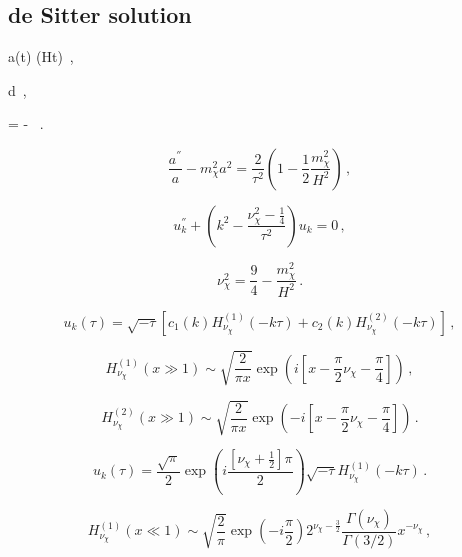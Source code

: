 \subsection{de Sitter solution}
\label{subsection:3.2.1}

\be 
a(t) \propto \exp(Ht)\, ,
\label{equation:3.2.26}
\ee

\be 
d\tau \equiv {}\, ,
\label{equation:3.2.27}
\ee

\be 
\tau = - \, .
\label{equation:3.2.28}
\ee

\begin{equation}
\frac{a^{''}}{a} - m_{\chi}^2 a^2 = \frac{2}{\tau^2} \left( 1 - \frac{1}{2}\frac{m_{\chi}^2}{H^2} \right) \, ,
\label{equation:3.2.29}
\end{equation}

\begin{equation}
u_k^{''} + \left( k^2 - \frac{\nu_{\chi}^2-\frac{1}{4}}{\tau^2} \right) u_k = 0 \, ,
\label{equation:3.2.30}
\end{equation}

\begin{equation}
\nu_{\chi}^2 = \frac{9}{4} - \frac{m_{\chi}^2}{H^2} \, .
\label{equation:3.2.31}
\end{equation}

\begin{equation}
u_k (\tau) = \sqrt{-\tau}\left [ c_1 (k) H_{\nu_{\chi}}^{(1)}(-k\tau) + c_2 (k) H_{\nu_{\chi}}^{(2)}(-k\tau) \right ] \, ,
\label{equation:3.2.32} 
\end{equation}

\begin{equation}
H_{\nu_{\chi}}^{(1)}(x \gg 1) \sim \sqrt{\frac{2}{\pi x}} \exp(i[x - \frac{\pi}{2}\nu_{\chi} - \frac{\pi}{4}]) \, ,
\label{equation:3.2.33}
\end{equation}

\begin{equation}
H_{\nu_{\chi}}^{(2)}(x \gg 1) \sim \sqrt{\frac{2}{\pi x}} \exp(-i[x - \frac{\pi}{2}\nu_{\chi} - \frac{\pi}{4}])\, .
\label{equation:3.2.34}
\end{equation}

\begin{equation}
u_k(\tau) = \frac{\sqrt{\pi}}{2} \exp(i\frac{[\nu_{\chi}+\frac{1}{2}]\pi}{2})\sqrt{-\tau} H_{\nu_{\chi}}^{(1)}(-k\tau)\, .
\label{equation:3.2.35}
\end{equation}

\begin{equation}
H_{\nu_{\chi}}^{(1)}(x \ll 1) \sim  \sqrt{\frac{2}{\pi}}\exp(-i\frac{\pi}{2})2^{\nu_{\chi}-\frac{3}{2}}\frac{\Gamma(\nu_{\chi})}{\Gamma(3/2)}x^{-\nu_\chi} \, ,
\label{equation:3.2.36}
\end{equation}

